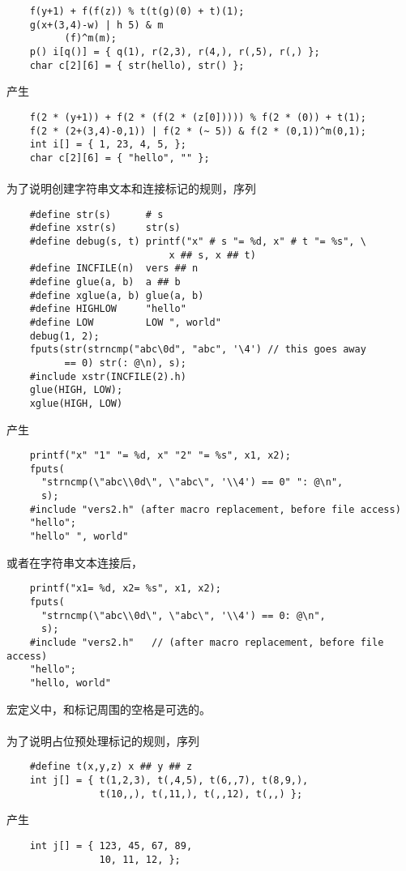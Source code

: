 {\begin{lstlisting}
    f(y+1) + f(f(z)) % t(t(g)(0) + t)(1);
    g(x+(3,4)-w) | h 5) & m
          (f)^m(m);
    p() i[q()] = { q(1), r(2,3), r(4,), r(,5), r(,) };
    char c[2][6] = { str(hello), str() };
\end{lstlisting}
产生
\begin{lstlisting}
    f(2 * (y+1)) + f(2 * (f(2 * (z[0])))) % f(2 * (0)) + t(1);
    f(2 * (2+(3,4)-0,1)) | f(2 * (~ 5)) & f(2 * (0,1))^m(0,1);
    int i[] = { 1, 23, 4, 5, };
    char c[2][6] = { "hello", "" };
\end{lstlisting}

\paragraph{}
\ex 为了说明创建字符串文本和连接标记的规则，序列
\begin{lstlisting}
    #define str(s)      # s
    #define xstr(s)     str(s)
    #define debug(s, t) printf("x" # s "= %d, x" # t "= %s", \
                            x ## s, x ## t)
    #define INCFILE(n)  vers ## n
    #define glue(a, b)  a ## b
    #define xglue(a, b) glue(a, b)
    #define HIGHLOW     "hello"
    #define LOW         LOW ", world"
    debug(1, 2);
    fputs(str(strncmp("abc\0d", "abc", '\4') // this goes away
          == 0) str(: @\n), s);
    #include xstr(INCFILE(2).h)
    glue(HIGH, LOW);
    xglue(HIGH, LOW)
\end{lstlisting}
产生
\begin{lstlisting}
    printf("x" "1" "= %d, x" "2" "= %s", x1, x2);
    fputs(
      "strncmp(\"abc\\0d\", \"abc\", '\\4') == 0" ": @\n",
      s);
    #include "vers2.h" (after macro replacement, before file access)
    "hello";
    "hello" ", world"
\end{lstlisting}
或者在字符串文本连接后，
\begin{lstlisting}
    printf("x1= %d, x2= %s", x1, x2);
    fputs(
      "strncmp(\"abc\\0d\", \"abc\", '\\4') == 0: @\n",
      s);
    #include "vers2.h"   // (after macro replacement, before file access)
    "hello";
    "hello, world"
\end{lstlisting}
宏定义中，\tm{\#}和\tm{\#\#}标记周围的空格是可选的。

\paragraph{}
\ex 为了说明占位预处理标记的规则，序列
\begin{lstlisting}
    #define t(x,y,z) x ## y ## z
    int j[] = { t(1,2,3), t(,4,5), t(6,,7), t(8,9,),
                t(10,,), t(,11,), t(,,12), t(,,) };
\end{lstlisting}
产生
\begin{lstlisting}
    int j[] = { 123, 45, 67, 89,
                10, 11, 12, };
\end{lstlisting}

}
